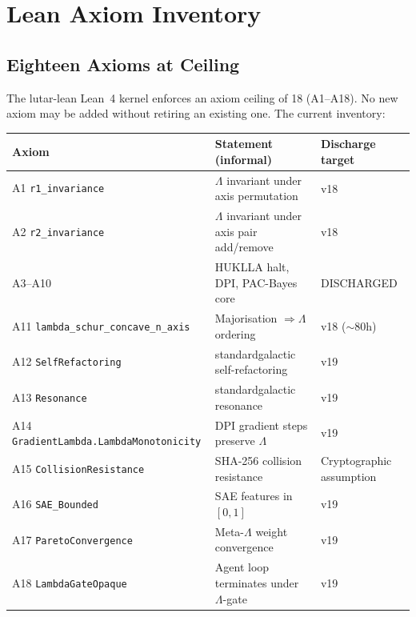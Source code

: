 \section{Lean Axiom Inventory}
\label{sec:lean-axioms}

\subsection{Eighteen Axioms at Ceiling}
\label{ssec:axiom-ceiling}

The lutar-lean Lean~4 kernel enforces an axiom ceiling of 18 (A1--A18).
No new axiom may be added without retiring an existing one.  The current
inventory:

\begin{center}
\begin{tabular}{lll}
  \textbf{Axiom} & \textbf{Statement (informal)} & \textbf{Discharge target} \\
  \hline
  A1 \texttt{r1\_invariance} & \(\Lambda\) invariant under axis permutation & v18 \\
  A2 \texttt{r2\_invariance} & \(\Lambda\) invariant under axis pair add/remove & v18 \\
  A3--A10 & HUKLLA halt, DPI, PAC-Bayes core & DISCHARGED \\
  A11 \texttt{lambda\_schur\_concave\_n\_axis} & Majorisation \(\Rightarrow \Lambda\) ordering & v18 ($\sim$80h) \\
  A12 \texttt{SelfRefactoring} & standardgalactic self-refactoring & v19 \\
  A13 \texttt{Resonance} & standardgalactic resonance & v19 \\
  A14 \texttt{GradientLambda.LambdaMonotonicity} & DPI gradient steps preserve \(\Lambda\) & v19 \\
  A15 \texttt{CollisionResistance} & SHA-256 collision resistance & Cryptographic assumption \\
  A16 \texttt{SAE\_Bounded} & SAE features in \([0,1]\) & v19 \\
  A17 \texttt{ParetoConvergence} & Meta-\(\Lambda\) weight convergence & v19 \\
  A18 \texttt{LambdaGateOpaque} & Agent loop terminates under \(\Lambda\)-gate & v19 \\
\end{tabular}
\end{center}

